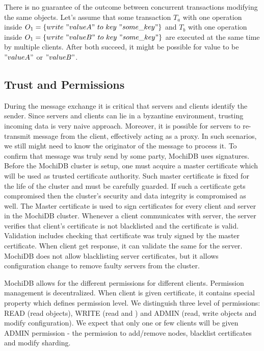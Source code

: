 \documentclass[letterpaper,twocolumn,10pt]{article}
\begin{document}
There is no guarantee of the outcome between concurrent transactions modifying the same objects. Let's assume that some transaction $T_{a}$ with one operation inside $O_{1} = \{write\ "valueA"\ to\ key\ "some\_key" \}$ and $T_{b}$ with one operation inside $O_{1} = \{write\ "valueB"\ to\ key\ "some\_key" \}$ are executed at the same time by multiple clients. After both succeed, it might be possible for value to be $"valueA"$ or $"valueB"$.

\subsection{Trust and Permissions}

During the message exchange it is critical that servers and clients identify the sender. Since servers and clients can lie in a byzantine environment, trusting incoming data is very naive approach. Moreover, it is possible for servers to re-transmit message from the client, effectively acting as a proxy. In such scenarios, we still might need to know the originator of the message to process it. To confirm that message was truly send by some party, MochiDB uses signatures.
Before the MochiDB cluster is setup, one must acquire a master certificate which will be used as trusted certificate authority. Such master certificate is fixed for the life of the cluster and must be carefully guarded. If such a certificate gets compromised then the cluster's security and data integrity is compromised as well. 
The Master certificate is used to sign certificates for every client and server in the MochiDB cluster. Whenever a client communicates with server, the server verifies that client's certificate is not blacklisted and the certificate is valid. Validation includes checking that certificate was truly signed by the master certificate. When client get response, it can validate the same for the server. MochiDB does not allow blacklisting server certificates, but it allows configuration change to remove faulty servers from the cluster.

MochiDB allows for the different permissions for different clients. Permission management is decentralized. When client is given certificate, it contains special property which defines permission level. We distinguish three level of permissions: READ (read objects), WRITE (read and ) and ADMIN (read, write objects and modify configuration). We expect that only one or few clients will be given ADMIN permission - the permission to add/remove nodes, blacklist certificates and modify sharding.
\end{document}

